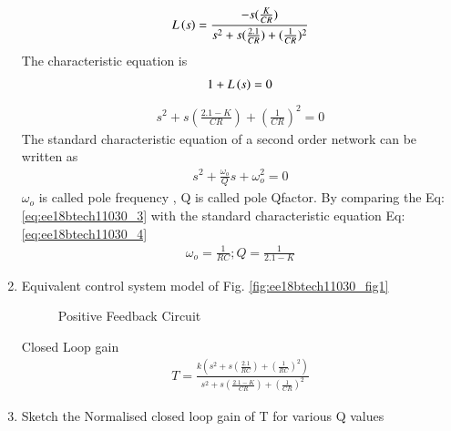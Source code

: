 \begin{enumerate}[label=\arabic*.,ref=\theenumi]
\begin{align}
    L\left(s\right) = \frac{-s(\frac{K}{CR})}{s^2 + s(\frac{2.1}{CR}) + (\frac{1}{CR})^2}
\end{align}
The characteristic equation is 
\begin{align}
    1+L\left(s\right)=0  
\end{align}
\begin{align}
s^2 + s(\frac{2.1-K}{CR}) + (\frac{1}{CR})^2 = 0
\label{eq:ee18btech11030_3}
\end{align}
The standard characteristic equation of a second order network can be written as 
\begin{align}
    s^2 + \frac{\omega_o}{Q}s + \omega_o^2 = 0
    \label{eq:ee18btech11030_4}
\end{align}
$\omega_o$ is called pole frequency , Q is called pole Qfactor. 
By comparing the Eq:\ref{eq:ee18btech11030_3} with the standard characteristic equation Eq:\ref{eq:ee18btech11030_4}
\begin{align}
   \omega_o = \frac{1}{RC} ; Q = \frac{1}{2.1-K}
\end{align}

\item Equivalent control system model of Fig. \ref{fig:ee18btech11030_fig1}

\solution
\begin{figure}[!ht]
	\begin{center}
		\resizebox{\columnwidth/1}{!}{}
	\end{center}
	\caption{ Positive Feedback Circuit}
	\label{fig:ee18btech11030_fig2}
\end{figure}

Closed Loop gain 
\begin{align}
T = \frac{k(s^2+s(\frac{2.1}{RC})+(\frac{1}{RC})^2)}{s^2 + s(\frac{2.1-K}{CR}) + (\frac{1}{CR})^2}
\label{eq:ee18btech11030_5}
\end{align}

\item Sketch the Normalised closed loop gain of T for various Q values


\end{enumerate}
